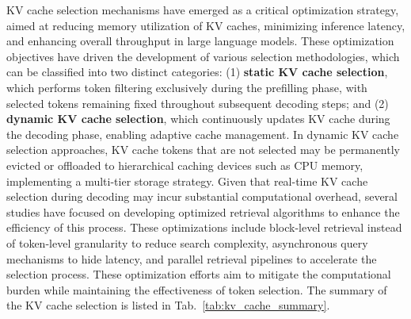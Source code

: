 KV cache selection mechanisms have emerged as a critical optimization strategy, aimed at reducing memory 
utilization of KV caches, minimizing inference latency, and enhancing overall throughput in large language models. 
These optimization objectives have driven the development of various selection methodologies, which can be 
classified into two distinct categories:
(1) \textbf{static KV cache selection}, which performs token filtering exclusively during the prefilling phase, with selected 
tokens remaining fixed throughout subsequent decoding steps; and (2) \textbf{dynamic KV cache selection}, which continuously 
updates KV cache during the decoding phase, enabling adaptive cache management.
In dynamic KV cache selection approaches, KV cache tokens that are not selected may be permanently evicted or offloaded to hierarchical caching devices such as 
CPU memory, implementing a multi-tier storage strategy. 
Given that real-time KV cache selection during decoding may incur substantial computational overhead, 
several studies have focused on developing optimized retrieval algorithms to enhance the efficiency of 
this process. These optimizations include block-level retrieval instead of token-level granularity to reduce 
search complexity, asynchronous query mechanisms to hide latency, and parallel retrieval pipelines to 
accelerate the selection process. These optimization efforts aim to mitigate the computational burden 
while maintaining the effectiveness of token selection.
The summary of the KV cache selection is listed in Tab.~\ref{tab:kv_cache_summary}.


